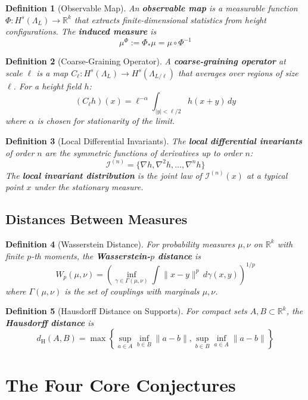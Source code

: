 \documentclass[11pt]{article}
\newtheorem{definition}{Definition}[section]
\newcommand{\R}{\mathbb{R}}
\newcommand{\dH}{d_{\mathrm{H}}}
\newcommand{\Wp}{W_p}
\begin{document}
\begin{definition}[Observable Map]
An \textbf{observable map} is a measurable function $\Phi: H^s(\Lambda_L) \to \R^k$ that extracts finite-dimensional statistics from height configurations. The \textbf{induced measure} is
\[
\mu^\Phi := \Phi_* \mu = \mu \circ \Phi^{-1}
\]
\end{definition}

\begin{definition}[Coarse-Graining Operator]
A \textbf{coarse-graining operator} at scale $\ell$ is a map $C_\ell: H^s(\Lambda_L) \to H^s(\Lambda_{L/\ell})$ that averages over regions of size $\ell$. For a height field $h$:
\[
(C_\ell h)(x) = \ell^{-\alpha} \int_{|y| < \ell/2} h(x + y) \, dy
\]
where $\alpha$ is chosen for stationarity of the limit.
\end{definition}

\begin{definition}[Local Differential Invariants]
The \textbf{local differential invariants} of order $n$ are the symmetric functions of derivatives up to order $n$:
\[
\mathcal{I}^{(n)} = \{\nabla h, \nabla^2 h, \ldots, \nabla^n h\}
\]
The \textbf{local invariant distribution} is the joint law of $\mathcal{I}^{(n)}(x)$ at a typical point $x$ under the stationary measure.
\end{definition}

\subsection{Distances Between Measures}

\begin{definition}[Wasserstein Distance]
For probability measures $\mu, \nu$ on $\R^k$ with finite $p$-th moments, the \textbf{Wasserstein-$p$ distance} is
\[
\Wp(\mu, \nu) = \left( \inf_{\gamma \in \Gamma(\mu,\nu)} \int \|x - y\|^p \, d\gamma(x,y) \right)^{1/p}
\]
where $\Gamma(\mu,\nu)$ is the set of couplings with marginals $\mu, \nu$.
\end{definition}

\begin{definition}[Hausdorff Distance on Supports]
For compact sets $A, B \subset \R^k$, the \textbf{Hausdorff distance} is
\[
\dH(A, B) = \max\left\{ \sup_{a \in A} \inf_{b \in B} \|a-b\|, \sup_{b \in B} \inf_{a \in A} \|a-b\| \right\}
\]
\end{definition}

\section{The Four Core Conjectures}
\end{document}

